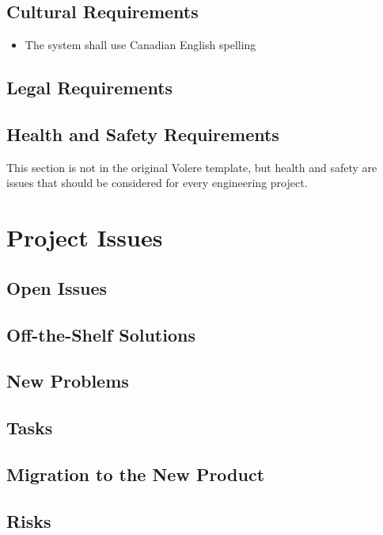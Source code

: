 \documentclass[12pt, titlepage]{article}
\begin{document}
\subsection{Cultural Requirements}
\begin{itemize}
    \item The system shall use Canadian English spelling
\end{itemize}

\subsection{Legal Requirements}

\subsection{Health and Safety Requirements}

This section is not in the original Volere template, but health and safety are
issues that should be considered for every engineering project.

\section{Project Issues}

\subsection{Open Issues}

\subsection{Off-the-Shelf Solutions}

\subsection{New Problems}

\subsection{Tasks}

\subsection{Migration to the New Product}

\subsection{Risks}
\end{document}

